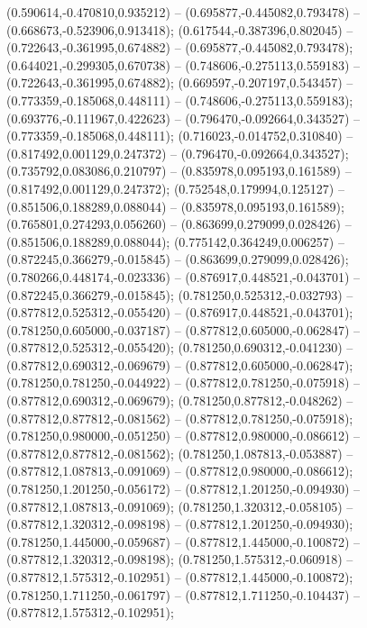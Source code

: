  (0.590614,-0.470810,0.935212) -- (0.695877,-0.445082,0.793478) -- (0.668673,-0.523906,0.913418);
 (0.617544,-0.387396,0.802045) -- (0.722643,-0.361995,0.674882) -- (0.695877,-0.445082,0.793478);
 (0.644021,-0.299305,0.670738) -- (0.748606,-0.275113,0.559183) -- (0.722643,-0.361995,0.674882);
 (0.669597,-0.207197,0.543457) -- (0.773359,-0.185068,0.448111) -- (0.748606,-0.275113,0.559183);
 (0.693776,-0.111967,0.422623) -- (0.796470,-0.092664,0.343527) -- (0.773359,-0.185068,0.448111);
 (0.716023,-0.014752,0.310840) -- (0.817492,0.001129,0.247372) -- (0.796470,-0.092664,0.343527);
 (0.735792,0.083086,0.210797) -- (0.835978,0.095193,0.161589) -- (0.817492,0.001129,0.247372);
 (0.752548,0.179994,0.125127) -- (0.851506,0.188289,0.088044) -- (0.835978,0.095193,0.161589);
 (0.765801,0.274293,0.056260) -- (0.863699,0.279099,0.028426) -- (0.851506,0.188289,0.088044);
 (0.775142,0.364249,0.006257) -- (0.872245,0.366279,-0.015845) -- (0.863699,0.279099,0.028426);
 (0.780266,0.448174,-0.023336) -- (0.876917,0.448521,-0.043701) -- (0.872245,0.366279,-0.015845);
 (0.781250,0.525312,-0.032793) -- (0.877812,0.525312,-0.055420) -- (0.876917,0.448521,-0.043701);
 (0.781250,0.605000,-0.037187) -- (0.877812,0.605000,-0.062847) -- (0.877812,0.525312,-0.055420);
 (0.781250,0.690312,-0.041230) -- (0.877812,0.690312,-0.069679) -- (0.877812,0.605000,-0.062847);
 (0.781250,0.781250,-0.044922) -- (0.877812,0.781250,-0.075918) -- (0.877812,0.690312,-0.069679);
 (0.781250,0.877812,-0.048262) -- (0.877812,0.877812,-0.081562) -- (0.877812,0.781250,-0.075918);
 (0.781250,0.980000,-0.051250) -- (0.877812,0.980000,-0.086612) -- (0.877812,0.877812,-0.081562);
 (0.781250,1.087813,-0.053887) -- (0.877812,1.087813,-0.091069) -- (0.877812,0.980000,-0.086612);
 (0.781250,1.201250,-0.056172) -- (0.877812,1.201250,-0.094930) -- (0.877812,1.087813,-0.091069);
 (0.781250,1.320312,-0.058105) -- (0.877812,1.320312,-0.098198) -- (0.877812,1.201250,-0.094930);
 (0.781250,1.445000,-0.059687) -- (0.877812,1.445000,-0.100872) -- (0.877812,1.320312,-0.098198);
 (0.781250,1.575312,-0.060918) -- (0.877812,1.575312,-0.102951) -- (0.877812,1.445000,-0.100872);
 (0.781250,1.711250,-0.061797) -- (0.877812,1.711250,-0.104437) -- (0.877812,1.575312,-0.102951);
